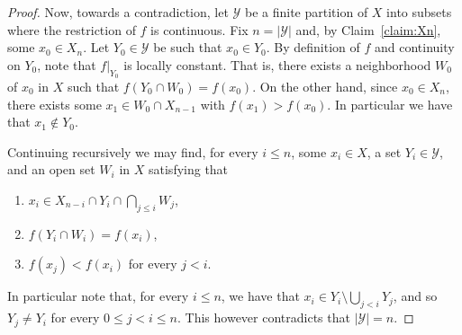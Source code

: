 \documentclass[12pt]{article}
\newcommand{\Nn}{\mathcal{N}}
\newcommand{\Yy}{\mathcal{Y}}
\theoremstyle{definition}
\theoremstyle{remark}
\begin{document}
\begin{proof}
Now, towards a contradiction, let $\Yy$ be a finite partition of $X$ into subsets where the restriction of $f$ is continuous. Fix $n=|\Yy|$ and, by Claim~\ref{claim:Xn}, some $x_0\in X_{n}$. Let $Y_0\in \Yy$ be such that $x_0\in Y_0$. By definition of $f$ and continuity on $Y_0$, note that $f|_{Y_0}$ is locally constant. That is, there exists a neighborhood $W_0$ of $x_0$ in $X$ such that $f(Y_0 \cap W_0)=f(x_0)$. On the other hand, since $x_0\in X_{n}$, there exists some $x_1\in W_0 \cap X_{n-1}$ with $f(x_1)>f(x_0)$. In particular we have that $x_1\notin Y_0$. 

Continuing recursively we may find, for every $i\leq n$, some $x_i\in X$, a set $Y_i\in \Yy$, and an open set $W_i$ in $X$ satisfying that 
\begin{enumerate}
\item $x_i \in X_{n-i} \cap Y_i \cap \bigcap_{j\leq i} W_j$, 
\item $f(Y_i \cap W_i)=f(x_i)$, 
\item $f(x_j)<f(x_i)$ for every $j<i$. 
\end{enumerate}
In particular note that, for every $i\leq n$, we have that $x_i \in Y_i \setminus \bigcup_{j < i} Y_j$, and so $Y_j \neq Y_i$ for every $0\leq j < i\leq n$. This however contradicts that $|\Yy|=n$.
\end{proof} 

\end{document}
